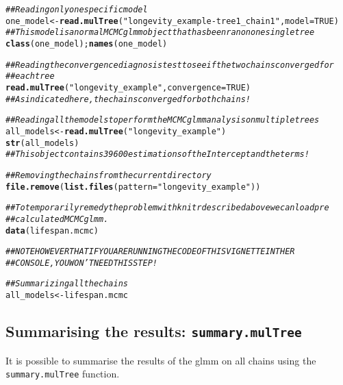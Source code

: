 \documentclass{article}\usepackage[]{graphicx}\usepackage[]{color}
\makeatletter
\newcommand{\hlnum}[1]{\textcolor[rgb]{0.686,0.059,0.569}{#1}}%
\newcommand{\hlstr}[1]{\textcolor[rgb]{0.192,0.494,0.8}{#1}}%
\newcommand{\hlcom}[1]{\textcolor[rgb]{0.678,0.584,0.686}{\textit{#1}}}%
\newcommand{\hlstd}[1]{\textcolor[rgb]{0.345,0.345,0.345}{#1}}%
\newcommand{\hlkwb}[1]{\textcolor[rgb]{0.69,0.353,0.396}{#1}}%
\newcommand{\hlkwc}[1]{\textcolor[rgb]{0.333,0.667,0.333}{#1}}%
\newcommand{\hlkwd}[1]{\textcolor[rgb]{0.737,0.353,0.396}{\textbf{#1}}}%
\newenvironment{kframe}{%
 \def\at@end@of@kframe{}%
 \ifinner\ifhmode%
  \def\at@end@of@kframe{\end{minipage}}%
  \begin{minipage}{\columnwidth}%
 \fi\fi%
 \def\FrameCommand##1{\hskip\@totalleftmargin \hskip-\fboxsep
 \colorbox{shadecolor}{##1}\hskip-\fboxsep
     \hskip-\linewidth \hskip-\@totalleftmargin \hskip\columnwidth}%
 \MakeFramed {\advance\hsize-\width
   \@totalleftmargin\z@ \linewidth\hsize
   \@setminipage}}%
 {\par\unskip\endMakeFramed%
 \at@end@of@kframe}
\newenvironment{knitrout}{}{} %
\makeatother
\begin{document}
\begin{knitrout}
\color{fgcolor}\begin{kframe}
\begin{alltt}
\hlcom{## Reading only one specific model}
\hlstd{one_model} \hlkwb{<-} \hlkwd{read.mulTree}\hlstd{(}\hlstr{"longevity_example-tree1_chain1"}\hlstd{,} \hlkwc{model} \hlstd{=} \hlnum{TRUE}\hlstd{)}
\hlcom{## This model is a normal MCMCglmm object that has been ran on one single tree}
\hlkwd{class}\hlstd{(one_model) ;} \hlkwd{names}\hlstd{(one_model)}

\hlcom{## Reading the convergence diagnosis test to see if the two chains converged for}
\hlcom{## each tree}
\hlkwd{read.mulTree}\hlstd{(}\hlstr{"longevity_example"}\hlstd{,} \hlkwc{convergence} \hlstd{=} \hlnum{TRUE}\hlstd{)}
\hlcom{## As indicated here, the chains converged for both chains!}

\hlcom{## Reading all the models to perform the MCMCglmm analysis on multiple trees}
\hlstd{all_models} \hlkwb{<-} \hlkwd{read.mulTree}\hlstd{(}\hlstr{"longevity_example"}\hlstd{)}
\hlkwd{str}\hlstd{(all_models)}
\hlcom{## This object contains 39600 estimations of the Intercept and the terms!}

\hlcom{## Removing the chains from the current directory}
\hlkwd{file.remove}\hlstd{(}\hlkwd{list.files}\hlstd{(}\hlkwc{pattern}\hlstd{=}\hlstr{"longevity_example"}\hlstd{))}
\end{alltt}
\end{kframe}
\end{knitrout}

\begin{knitrout}
\color{fgcolor}\begin{kframe}
\begin{alltt}
\hlcom{## To temporarily remedy the problem with knitr described above we can load pre}
\hlcom{## calculated MCMCglmm.}
\hlkwd{data}\hlstd{(lifespan.mcmc)}

\hlcom{## NOTE HOWEVER THAT IF YOU ARE RUNNING THE CODE OF THIS VIGNETTE IN THE R}
\hlcom{## CONSOLE, YOU WON'T NEED THIS STEP!}

\hlcom{## Summarizing all the chains}
\hlstd{all_models} \hlkwb{<-} \hlstd{lifespan.mcmc}
\end{alltt}
\end{kframe}
\end{knitrout}


\subsection{Summarising the results: \texttt{summary.mulTree}}
It is possible to summarise the results of the glmm on all chains using the \texttt{summary.mulTree} function.
\end{document}
